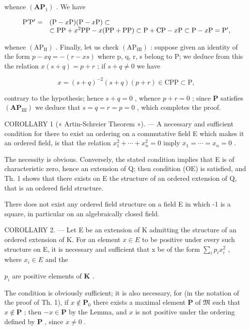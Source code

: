 whence \((\mathbf{AP}_1)\) . We have

\[
\begin{array}{r l} \mathrm {P^ {\prime} P^ {\prime}} = & (\mathrm{P} - x \mathrm{P}) (\mathrm{P} - x \mathrm{P}) \subset \\ & \subset \mathrm{PP} + x ^ {2} \mathrm{PP} - x (\mathrm{PP} + \mathrm{PP}) \subset \mathrm{P} + \mathrm{CP} - x \mathrm{P} \subset \mathrm{P} - x \mathrm{P} = \mathrm {P^ {\prime}}, \end{array}
\]

whence \((\mathrm{AP}_{\mathrm{II}})\) . Finally, let us check \((\mathrm{AP}_{\mathrm{III}})\) : suppose given an identity of the form \(p - xq = -(r - xs)\) where p, q, r, s belong to P; we deduce from this the relation \(x(s + q) = p + r\) ; if \(s + q \neq 0\) we have

\[
x = (s + q) ^ {- 2} (s + q) (p + r) \in \mathrm{CPP} \subset \mathrm{P},
\]

contrary to the hypothesis; hence \(s + q = 0\) , whence \(p + r = 0\) ; since \(\mathbf{P}\) satisfies \((\mathbf{AP}_{\mathrm{III}})\) we deduce that \(s = q = r = p = 0\) , which completes the proof.

COROLLARY 1 (« Artin-Schreier Theorem »). --- A necessary and sufficient condition for there to exist an ordering on a commutative field E which makes it an ordered field, is that the relation \(x_{1}^{2} + \cdots + x_{n}^{2} = 0\) imply \(x_{1} = \cdots = x_{n} = 0\) .

The necessity is obvious. Conversely, the stated condition implies that E is of characteristic zero, hence an extension of Q; then condition (OE) is satisfied, and Th. 1 shows that there exists on E the structure of an ordered extension of Q, that is an ordered field structure.

There does not exist any ordered field structure on a field E in which -1 is a square, in particular on an algebraically closed field.

COROLLARY 2. --- Let E be an extension of K admitting the structure of an ordered extension of K. For an element \(x \in E\) to be positive under every such structure on E, it is necessary and sufficient that x be of the form \(\sum_{i} p_{i} x_{i}^{2}\) , where \(x_{i} \in E\) and the

\(p_i\) are positive elements of \(\mathbf{K}\) .

The condition is obviously sufficient; it is also necessary, for (in the notation of the proof of Th. 1), if \(x \notin \mathbf{P}_0\) there exists a maximal element \(\mathbf{P}\) of \(\mathfrak{M}\) such that \(x \notin \mathbf{P}\) ; then \(-x \in \mathbf{P}\) by the Lemma, and \(x\) is not positive under the ordering defined by \(\mathbf{P}\) , since \(x \neq 0\) .


